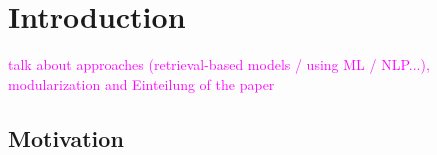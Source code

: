 \chapter{Introduction}
\label{introduction}
%
\textcolor{magenta}{talk about approaches (retrieval-based models / using ML / NLP...), modularization and Einteilung of the paper}


\section{Motivation}


